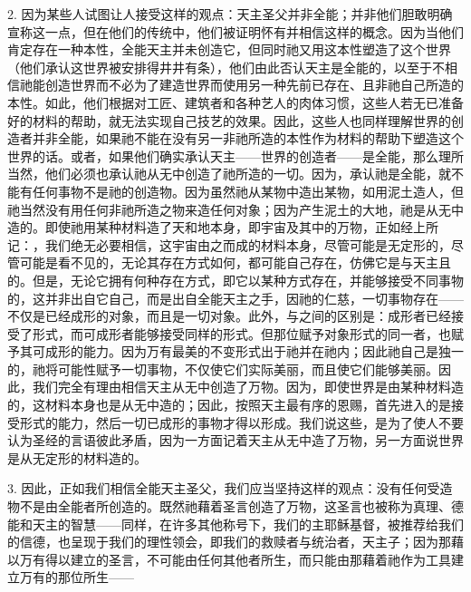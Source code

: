 2. 因为某些人试图让人接受这样的观点：天主圣父并非全能；并非他们胆敢明确宣称这一点，但在他们的传统中，他们被证明怀有并相信这样的概念。因为当他们肯定存在一种本性，全能天主并未创造它，但同时祂又用这本性塑造了这个世界（他们承认这世界被安排得井井有条），他们由此否认天主是全能的，以至于不相信祂能创造世界而不必为了建造世界而使用另一种先前已存在、且非祂自己所造的本性。如此，他们根据对工匠、建筑者和各种艺人的肉体习惯，这些人若无已准备好的材料的帮助，就无法实现自己技艺的效果。因此，这些人也同样理解世界的创造者并非全能，如果祂不能在没有另一非祂所造的本性作为材料的帮助下塑造这个世界的话。或者，如果他们确实承认天主——世界的创造者——是全能，那么理所当然，他们必须也承认祂从无中创造了祂所造的一切。因为，承认祂是全能，就不能有任何事物不是祂的创造物。因为虽然祂从某物中造出某物，如用泥土造人，但祂当然没有用任何非祂所造之物来造任何对象；因为产生泥土的大地，祂是从无中造的。即使祂用某种材料造了天和地本身，即宇宙及其中的万物，正如经上所记：，我们绝无必要相信，这宇宙由之而成的材料本身，尽管可能是无定形的，尽管可能是看不见的，无论其存在方式如何，都可能自己存在，仿佛它是与天主且的。但是，无论它拥有何种存在方式，即它以某种方式存在，并能够接受不同事物的，这并非出自它自己，而是出自全能天主之手，因祂的仁慈，一切事物存在——不仅是已经成形的对象，而且是一切对象。此外，与之间的区别是：成形者已经接受了形式，而可成形者能够接受同样的形式。但那位赋予对象形式的同一者，也赋予其可成形的能力。因为万有最美的不变形式出于祂并在祂内；因此祂自己是独一的，祂将可能性赋予一切事物，不仅使它们实际美丽，而且使它们能够美丽。因此，我们完全有理由相信天主从无中创造了万物。因为，即使世界是由某种材料造的，这材料本身也是从无中造的；因此，按照天主最有序的恩赐，首先进入的是接受形式的能力，然后一切已成形的事物才得以形成。我们说这些，是为了使人不要认为圣经的言语彼此矛盾，因为一方面记着天主从无中造了万物，另一方面说世界是从无定形的材料造的。\par

3. 因此，正如我们相信全能天主圣父，我们应当坚持这样的观点：没有任何受造物不是由全能者所创造的。既然祂藉着圣言创造了万物，这圣言也被称为真理、德能和天主的智慧——同样，在许多其他称号下，我们的主耶稣基督，被推荐给我们的信德，也呈现于我们的理性领会，即我们的救赎者与统治者，天主子；因为那藉以万有得以建立的圣言，不可能由任何其他者所生，而只能由那藉着祂作为工具建立万有的那位所生——\par


